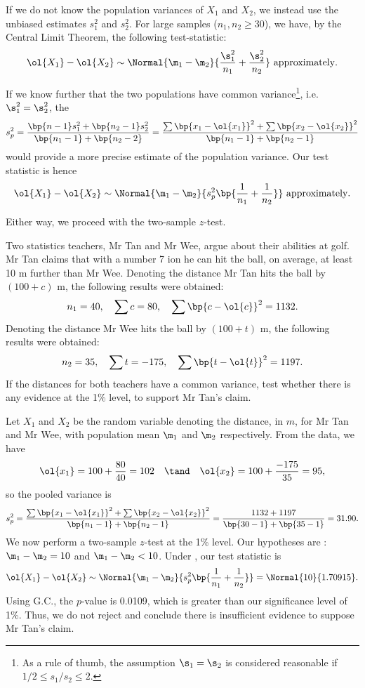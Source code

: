 If we do not know the population variances of $X_1$ and $X_2$, we instead use the unbiased estimates $s_1^2$ and $s_2^2$. For large samples ($n_1, n_2 \geq 30$), we have, by the Central Limit Theorem, the following test-statistic: \[\ol{X_1} - \ol{X_2} \sim \Normal{\m_1 - \m_2}{\frac{\s_1^2}{n_1} + \frac{\s_2^2}{n_2}} \text{ approximately}.\]

If we know further that the two populations have common variance\footnote{As a rule of thumb, the assumption $\s_1 = \s_2$ is considered reasonable if $1/2 \leq s_1/s_2 \leq 2$.}, i.e. $\s_1^2 = \s_2^2$, the  \[s_p^2 = \frac{\bp{n-1} s_1^2 + \bp{n_2 - 1} s_2^2}{\bp{n_1 - 1} + \bp{n_2 - 2}} = \frac{\sum \bp{x_1 - \ol{x_1}}^2 + \sum \bp{x_2 - \ol{x_2}}^2}{\bp{n_1 - 1} + \bp{n_2 - 1}}\] would provide a more precise estimate of the population variance. Our test statistic is hence \[\ol{X_1} - \ol{X_2} \sim \Normal{\m_1 - \m_2}{s_p^2 \bp{\frac{1}{n_1} + \frac{1}{n_2}}} \text{ approximately}.\]

Either way, we proceed with the two-sample $z$-test.

\begin{sample}
    Two statistics teachers, Mr Tan and Mr Wee, argue about their abilities at golf. Mr Tan claims that with a number 7 ion he can hit the ball, on average, at least 10 m further than Mr Wee. Denoting the distance Mr Tan hits the ball by $(100 + c)$ m, the following results were obtained: \[n_1 = 40, \quad \sum c = 80, \quad \sum \bp{c - \ol{c}}^2 = 1132.\] Denoting the distance Mr Wee hits the ball by $(100 + t)$ m, the following results were obtained: \[n_2 = 35, \quad \sum t = -175, \quad \sum \bp{t - \ol{t}}^2 = 1197.\] If the distances for both teachers have a common variance, test whether there is any evidence at the 1\% level, to support Mr Tan's claim.
\end{sample}
\begin{sampans}
    Let $X_1$ and $X_2$ be the random variable denoting the distance, in $m$, for Mr Tan and Mr Wee, with population mean $\m_1$ and $\m_2$ respectively. From the data, we have \[\ol{x_1} = 100 + \frac{80}{40} = 102 \quad \tand \quad \ol{x_2} = 100 + \frac{-175}{35} = 95,\] so the pooled variance is \[s_p^2 = \frac{\sum \bp{x_1 - \ol{x_1}}^2 + \sum \bp{x_2 - \ol{x_2}}^2}{\bp{n_1 - 1} + \bp{n_2 - 1}} = \frac{1132 + 1197}{\bp{30 - 1} + \bp{35 - 1}} = 31.90.\] We now perform a two-sample $z$-test at the 1\% level. Our hypotheses are \nullhyp: $\m_1 - \m_2 = 10$ and $\m_1 - \m_2 < 10$. Under \nullhyp, our test statistic is \[\ol{X_1} - \ol{X_2} \sim \Normal{\m_1 - \m_2}{s_p^2 \bp{\frac1{n_1} + \frac1{n_2}}} = \Normal{10}{1.70915}.\] Using G.C., the $p$-value is 0.0109, which is greater than our significance level of 1\%. Thus, we do not reject \nullhyp{} and conclude there is insufficient evidence to suppose Mr Tan's claim.
\end{sampans}


